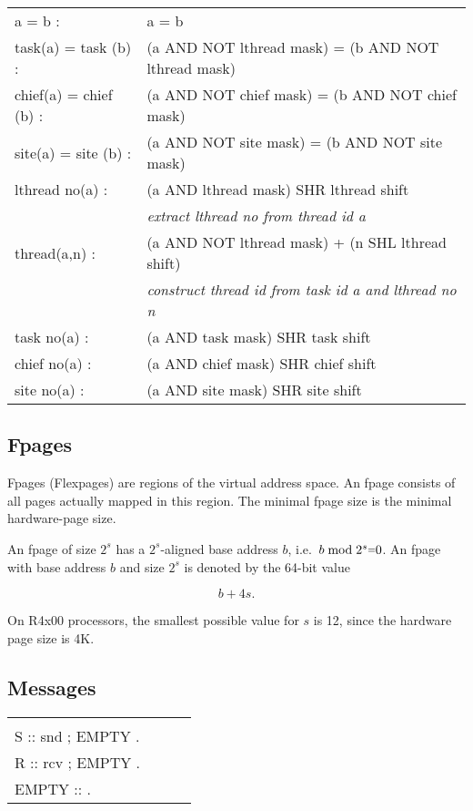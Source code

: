 \documentclass[a4paper,11pt,twoside,dvips]{book}
\newcommand{\smaller}[1]{{\mathchoice 
           {\raisebox{1pt}{$\scriptstyle #1$}} 
           {\raisebox{1pt}{$\scriptstyle #1$}} 
           {\raisebox{0.5pt}{$\scriptscriptstyle #1$}} 
           {\raisebox{0.5pt}{$\scriptscriptstyle #1$}} 
}}
\newcommand{\EQ}{\smaller{=}}
\newlength{\Up}\setlength{\Up}{-\baselineskip}
\newenvironment{vwg}{\par\vspace{10pt}%
\noindent\begin{tabular}{llll}\hspace*{80pt}&\hspace*{200pt}\\[\Up]} 
{\end{tabular}\par\vspace{10pt}}
\begin{document}
\begin{tabular}{ll} 
% 
a = b  :             &    a = b  \\[15pt] 
% 
task(a) = task (b) : &    (a AND NOT lthread mask) = (b AND NOT lthread mask)\\[15pt] 
% 
chief(a) = chief (b) : &  (a AND NOT chief mask) = (b AND NOT chief mask)\\[15pt] 
% 
site(a) = site (b) : &    (a AND NOT site mask) = (b AND NOT site mask)\\[15pt] 
% 
% 
lthread no(a) :      &  (a AND lthread mask) SHR lthread shift\\
		     &  \em extract lthread no from thread id
		     \emph{a}\\[15pt] 
%
thread(a,n) :        &  (a AND NOT lthread mask) + (n SHL lthread shift)\\
		     &  \em construct thread id from task id
		     \emph{a} and lthread no \emph{n} \\[15pt] 
% 
task no(a) :         &  (a AND task mask) SHR task shift  \\[15pt] 
% 
chief no(a) :        &  (a AND chief mask) SHR chief shift \\[15pt] 
% 
site no(a) :         &  (a AND site mask) SHR site shift
% 
\end{tabular} 



\subsection{Fpages} 
 
Fpages (Flexpages) are regions of the virtual address space. An fpage
consists of all pages actually mapped in this region. The minimal fpage size
is the minimal hardware-page size. 

An fpage of size
$2^s$ has a $2^s$-aligned base address $b$, i.e.\ $b \bmod 2^s \EQ 0$.
An fpage with base address $b$ and size $2^s$ is denoted by the 64-bit value
 
\[ b + 4s .\] 
 
\noindent On R4x00 processors, the smallest possible value for $s$ is 12,
since the hardware page size is 4K.
 
 
\subsection{Messages} 
 
\begin{vwg} 
S :: snd ; EMPTY . \\[8pt] 
R :: rcv ; EMPTY . \\[8pt] 
EMPTY :: . 
\end{vwg} 
 
\end{document}
